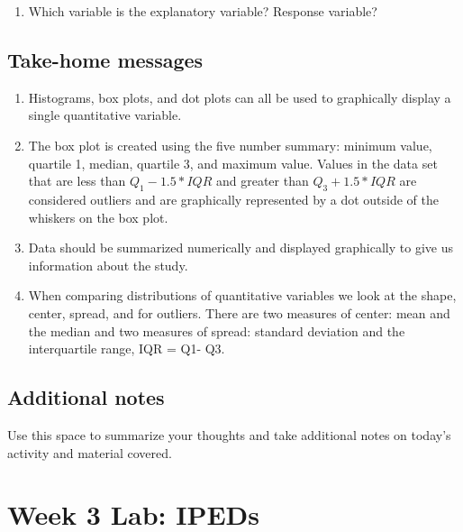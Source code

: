 \documentclass[
]{report}
\providecommand{\tightlist}{%
  \setlength{\itemsep}{0pt}\setlength{\parskip}{0pt}}
\begin{document}
\begin{enumerate}
\def\labelenumi{\arabic{enumi}.}
\setcounter{enumi}{16}
\tightlist
\item
  Which variable is the explanatory variable? Response variable?
\end{enumerate}

\vspace{0.4in}

\hypertarget{take-home-messages-5}{%
\subsection{Take-home messages}\label{take-home-messages-5}}

\begin{enumerate}
\def\labelenumi{\arabic{enumi}.}
\item
  Histograms, box plots, and dot plots can all be used to graphically display a single quantitative variable.
\item
  The box plot is created using the five number summary: minimum value, quartile 1, median, quartile 3, and maximum value. Values in the data set that are less than \(Q_1 - 1.5*IQR\) and greater than \(Q_3 + 1.5*IQR\) are considered outliers and are graphically represented by a dot outside of the whiskers on the box plot.
\item
  Data should be summarized numerically and displayed graphically to give us information about the study.
\item
  When comparing distributions of quantitative variables we look at the shape, center, spread, and for outliers. There are two measures of center: mean and the median and two measures of spread: standard deviation and the interquartile range, IQR = Q1- Q3.
\end{enumerate}

\hypertarget{additional-notes-5}{%
\subsection{Additional notes}\label{additional-notes-5}}

Use this space to summarize your thoughts and take additional notes on today's activity and material covered.

\newpage

\hypertarget{week-3-lab-ipeds}{%
\section{Week 3 Lab: IPEDs}\label{week-3-lab-ipeds}}
\end{document}
